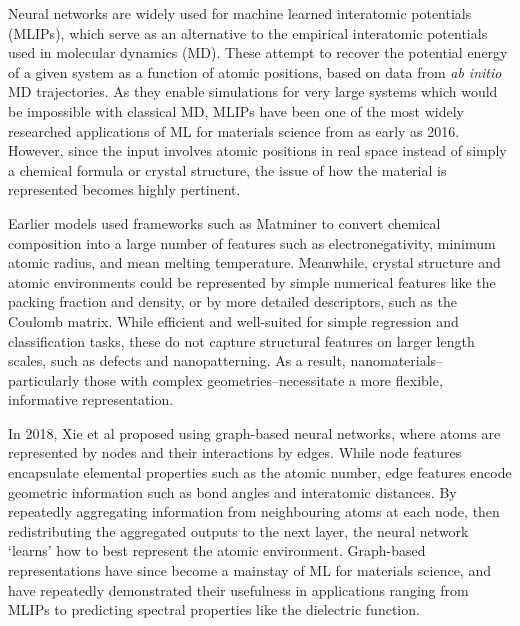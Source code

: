 \documentclass[11pt,a4paper,twoside]{report}  %
\numberwithin{equation}{section}					%
\numberwithin{figure}{section}						%
\begin{document}

Neural networks are widely used for machine learned interatomic potentials (MLIPs), which serve as an alternative to the empirical interatomic potentials used in molecular dynamics (MD). These attempt to recover the potential energy of a given system as a function of atomic positions, based on data from \textit{ab initio} MD trajectories. As they enable simulations for very large systems which would be impossible with classical MD, MLIPs have been one of the most widely researched applications of ML for materials science from as early as 2016\autocite{behlerPerspectiveMachineLearning2016}. However, since the input involves atomic positions in real space instead of simply a chemical formula or crystal structure, the issue of how the material is represented becomes highly pertinent\autocite{fangLearningAtomicRepresentations2026}. 

Earlier models used frameworks such as Matminer to convert chemical composition into a large number of features such as electronegativity, minimum atomic radius, and mean melting temperature. Meanwhile, crystal structure and atomic environments could be represented by simple numerical features like the packing fraction and density, or by more detailed descriptors, such as the Coulomb matrix. While efficient and well-suited for simple regression and classification tasks, these do not capture structural features on larger length scales, such as defects and nanopatterning. As a result, nanomaterials--particularly those with complex geometries--necessitate a more flexible, informative representation.

In 2018, Xie et al proposed using graph-based neural networks, where atoms are represented by nodes and their interactions by edges\autocite{xieCrystalGraphConvolutional2018}. While node features encapsulate elemental properties such as the atomic number, edge features encode geometric information such as bond angles and interatomic distances. By repeatedly aggregating information from neighbouring atoms at each node, then redistributing the aggregated outputs to the next layer, the neural network `learns' how to best represent the atomic environment. Graph-based representations have since become a mainstay of ML for materials science, and have repeatedly demonstrated their usefulness in applications ranging from MLIPs to predicting spectral properties like the dielectric function.
\end{document}
